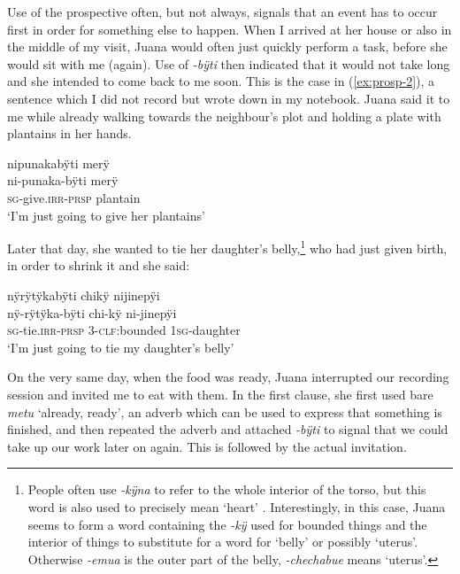 Use of the prospective often, but not always, signals that an event has to occur first in order for something else to happen. When I arrived at her house or also in the middle of my visit, Juana would often just quickly perform a task, before she would sit with me (again). Use of \textit{-bÿti} then indicated that it would not take long and she intended to come back to me soon. This is the case in (\ref{ex:prosp-2}), a sentence which I did not record but wrote down in my notebook. Juana said it to me while already walking towards the neighbour’s plot and holding a plate with plantains in her hands.

\ea\label{ex:prosp-2}
\begingl
\glpreamble nipunakabÿti merÿ\\
\gla ni-punaka-bÿti merÿ\\
\textsc{sg}-give.\textsc{irr}-\textsc{prsp} plantain\\
\glft ‘I’m just going to give her plantains’
\endgl
\trailingcitation{[jxx-120430l-nr]}
\xe

Later that day, she wanted to tie her daughter’s belly,\footnote{People often use \textit{-kÿna} to refer to the whole interior of the torso, but this word is also used to precisely mean ‘heart’ \citep[cf.][]{TerhartDanielsenBODY}. Interestingly, in this case, Juana seems to form a word containing the  \textit{-kÿ} used for bounded things and the interior of things to substitute for a word for ‘belly’ or possibly ‘uterus’. Otherwise \textit{-emua} is the outer part of the belly, \textit{-chechabue} means ‘uterus’.} who had just given birth, in order to shrink it and she said:

\ea\label{ex:prosp-3}
\begingl
\glpreamble nÿrÿtÿkabÿti chikÿ nijinepÿi\\
\gla nÿ-rÿtÿka-bÿti chi-kÿ ni-jinepÿi\\
\textsc{sg}-tie.\textsc{irr}-\textsc{prsp} 3-\textsc{clf:}bounded 1\textsc{sg}-daughter\\
\glft ‘I’m just going to tie my daughter’s belly’
\endgl
\trailingcitation{[jxx-e120430l-2.1]}
\xe

On the very same day, when the food was ready, Juana interrupted our recording session and invited me to eat with them. In the first clause, she first used bare \textit{metu} ‘already, ready’, an adverb which can be used to express that something is finished, and then repeated the adverb and attached \textit{-bÿti} to signal that we could take up our work later on again. This is followed by the actual invitation.

